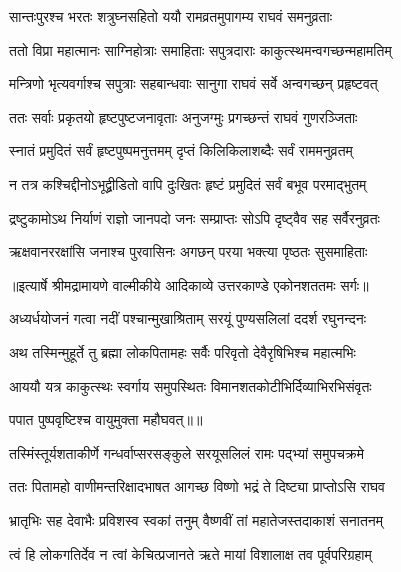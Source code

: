 \twolineshloka
{सान्तःपुरश्च भरतः शत्रुघ्नसहितो ययौ}
{रामव्रतमुपागम्य राघवं समनुव्रताः} %

\twolineshloka
{ततो विप्रा महात्मानः साग्निहोत्राः समाहिताः}
{सपुत्रदाराः काकुत्स्थमन्वगच्छन्महामतिम्} %

\twolineshloka
{मन्त्रिणो भृत्यवर्गाश्च सपुत्राः सहबान्धवाः}
{सानुगा राघवं सर्वे अन्वगच्छन् प्रहृष्टवत्} %

\twolineshloka
{ततः सर्वाः प्रकृतयो हृष्टपुष्टजनावृताः}
{अनुजग्मुः प्रगच्छन्तं राघवं गुणरञ्जिताः} %

\twolineshloka
{स्नातं प्रमुदितं सर्वं हृष्टपुष्पमनुत्तमम्}
{दृप्तं किलिकिलाशब्दैः सर्वं राममनुव्रतम्} %

\twolineshloka
{न तत्र कश्चिद्दीनोऽभूद्व्रीडितो वापि दुःखितः}
{हृष्टं प्रमुदितं सर्वं बभूव परमाद्भुतम्} %

\twolineshloka
{द्रष्टुकामोऽथ निर्याणं राज्ञो जानपदो जनः}
{सम्प्राप्तः सोऽपि दृष्ट्वैव सह सर्वैरनुव्रतः} %

\twolineshloka
{ऋक्षवानररक्षांसि जनाश्च पुरवासिनः}
{अगछन् परया भक्त्या पृष्ठतः सुसमाहिताः} %


{॥इत्यार्षे श्रीमद्रामायणे वाल्मीकीये आदिकाव्ये उत्तरकाण्डे एकोनशततमः सर्गः॥}


\twolineshloka
{अध्यर्धयोजनं गत्वा नदीं पश्चान्मुखाश्रिताम्}
{सरयूं पुण्यसलिलां ददर्श रघुनन्दनः} %

\twolineshloka
{अथ तस्मिन्मुहूर्ते तु ब्रह्मा लोकपितामहः}
{सर्वैः परिवृतो देवैरृषिभिश्च महात्मभिः} %

\twolineshloka
{आययौ यत्र काकुत्स्थः स्वर्गाय समुपस्थितः}
{विमानशतकोटीभिर्दिव्याभिरभिसंवृतः} %

{पपात पुष्पवृष्टिश्च वायुमुक्ता महौघवत्॥॥} %

\addtocounter{shlokacount}{1}

\twolineshloka
{तस्मिंस्तूर्यशताकीर्णे गन्धर्वाप्सरसङ्कुले}
{सरयूसलिलं रामः पद्भ्यां समुपचक्रमे} %

\twolineshloka
{ततः पितामहो वाणीमन्तरिक्षादभाषत}
{आगच्छ विष्णो भद्रं ते दिष्ट्या प्राप्तोऽसि राघव} %

\twolineshloka
{भ्रातृभिः सह देवाभैः प्रविशस्व स्वकां तनुम्}
{वैष्णवीं तां महातेजस्तदाकाशं सनातनम्} %

\twolineshloka
{त्वं हि लोकगतिर्देव न त्वां केचित्प्रजानते}
{ऋते मायां विशालाक्ष तव पूर्वपरिग्रहाम्} %

